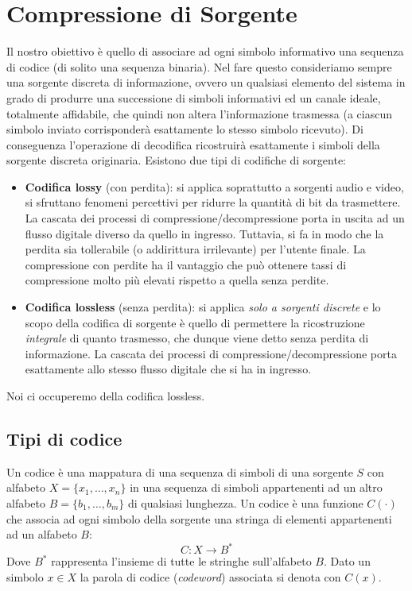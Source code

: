 \section{Compressione di Sorgente} \label{sec:sorg}
Il nostro obiettivo \`e quello di  associare  ad  ogni  simbolo informativo una sequenza di codice (di solito una sequenza binaria). Nel fare questo consideriamo sempre  una sorgente discreta di informazione, ovvero un  qualsiasi  elemento  del sistema  in  grado  di  produrre  una  successione  di  simboli  informativi ed  un canale ideale,  totalmente  affidabile, che quindi non altera l’informazione trasmessa (a ciascun simbolo inviato corrisponderà esattamente lo stesso simbolo ricevuto).
Di conseguenza l’operazione di decodifica ricostruirà esattamente i simboli della sorgente discreta originaria.
Esistono due tipi di codifiche di sorgente:
\begin{itemize}
    \item \textbf{Codifica lossy} (con perdita): si  applica  soprattutto  a  sorgenti  audio  e  video,  si  sfruttano fenomeni percettivi per    ridurre    la    quantità    di    bit    da    trasmettere. La cascata    dei processi di compressione/decompressione  porta  in  uscita  ad  un  flusso  digitale  diverso  da  quello in  ingresso. Tuttavia, si fa in modo che la perdita sia tollerabile (o addirittura irrilevante) per l’utente finale. La  compressione con perdite ha il vantaggio che può ottenere tassi di compressione molto più elevati rispetto a quella senza perdite.
    \item \textbf{Codifica lossless} (senza perdita): si  applica  \textit{solo  a  sorgenti  discrete} e  lo  scopo  della  codifica  di sorgente  è  quello  di  permettere  la  ricostruzione \textit{integrale} di  quanto  trasmesso,  che  dunque  viene detto senza perdita di informazione. La cascata dei processi di compressione/decompressione porta esattamente allo stesso flusso digitale che si ha in ingresso. 
\end{itemize}
Noi ci occuperemo della codifica lossless.
\subsection{Tipi di codice}
Un codice è una mappatura di una sequenza di simboli di una sorgente $S$ con alfabeto $X = \{x_1, \dots, x_n\}$ in una sequenza di simboli appartenenti  ad  un  altro  alfabeto $B = \{b_1, \dots, b_m\}$ di qualsiasi lunghezza.
 Un codice \`e una funzione $C(\cdot)$ che associa ad ogni simbolo della sorgente una stringa di elementi appartenenti ad un alfabeto $B$:
\begin{equation}
    C: X \to B^*
\end{equation}
Dove $B^*$ rappresenta l'insieme di tutte le stringhe sull'alfabeto $B$. Dato un simbolo $x \in X$ la parola di codice (\textit{codeword}) associata si denota con $C(x)$.

